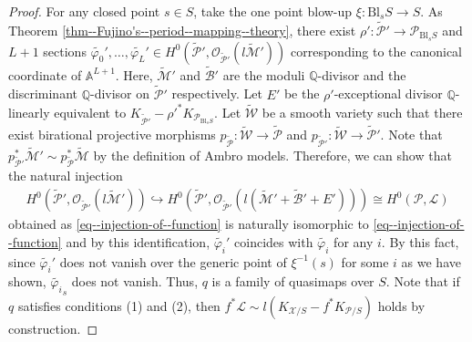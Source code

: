\documentclass[10pt,a4paper]{amsart}
\begin{document}
\begin{proof}
For any closed point $s\in S$, take the one point blow-up $\xi\colon \mathrm{Bl}_sS\to S$.
As Theorem \ref{thm--Fujino's--period--mapping--theory}, there exist $\rho'\colon \widetilde{\mathcal{P}}'\to\mathcal{P}_{\mathrm{Bl}_sS}$ and $L+1$ sections $\widetilde{\varphi_0}',\ldots,\widetilde{\varphi_L}'\in H^0(\tilde{\mathcal{P}}',\mathcal{O}_{\widetilde{\mathcal{P}}'}(l\widetilde{\mathcal{M}}'))$ corresponding to the canonical coordinate of $\mathbb{A}^{L+1}$.
Here, $\widetilde{\mathcal{M}}'$ and $\widetilde{\mathcal{B}}'$ are the moduli $\mathbb{Q}$-divisor and the discriminant $\mathbb{Q}$-divisor on $\tilde{\mathcal{P}}'$ respectively.
Let $E'$ be the $\rho'$-exceptional divisor $\mathbb{Q}$-linearly equivalent to $K_{\widetilde{\mathcal{P}}'}-\rho'^*K_{\mathcal{P}_{\mathrm{Bl}_sS}}$. 
Let $\widetilde{\mathcal{W}}$ be a smooth variety such that there exist birational projective morphisms $p_{\tilde{\mathcal{P}}}\colon \widetilde{\mathcal{W}}\to \tilde{\mathcal{P}}$ and $p_{\widetilde{\mathcal{P}}'}\colon \widetilde{\mathcal{W}}\to \widetilde{\mathcal{P}}'$.
Note that $p_{\widetilde{\mathcal{P}}'}^*\widetilde{\mathcal{M}}'\sim p_{\tilde{\mathcal{P}}}^*\widetilde{\mathcal{M}}$ by the definition of Ambro models.
Therefore, we can show that the natural injection
\begin{align*}
   H^0(\widetilde{\mathcal{P}}',\mathcal{O}_{\widetilde{\mathcal{P}}'}(l\widetilde{\mathcal{M}}'))\hookrightarrow H^0(\widetilde{\mathcal{P}}',\mathcal{O}_{\widetilde{\mathcal{P}}'}(l(\widetilde{\mathcal{M}}'+\widetilde{\mathcal{B}}'+E')))\cong H^0(\mathcal{P},\mathscr{L})
\end{align*}
obtained as \eqref{eq--injection-of--function} is naturally isomorphic to \eqref{eq--injection-of--function} and by this identification, $\widetilde{\varphi_i}'$ coincides with $\widetilde{\varphi_i}$ for any $i$.
By this fact, since $\widetilde{\varphi_i}'$ does not vanish over the generic point of $\xi^{-1}(s)$ for some $i$ as we have shown, $\widetilde{\varphi_i}_s$ does not vanish.
Thus, $q$ is a family of quasimaps over $S$.
Note that if $q$ satisfies conditions (1) and (2), then $f^*\mathscr{L}\sim l(K_{\mathcal{X}/S}-f^*K_{\mathcal{P}/S})$ holds by construction.


\end{proof}
\end{document}
